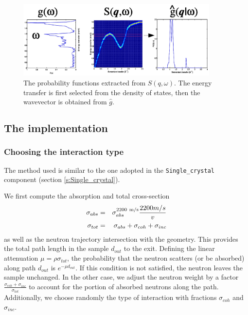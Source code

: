 \begin{figure}
  \begin{center}
    \includegraphics[width=0.9\textwidth]{figures/Sqw_sampling.eps}
  \end{center}
\caption{The probability functions extracted from $S(q,\omega)$. The energy transfer is first selected from the density of states, then the wavevector is obtained from $\hat g$.}
\label{f:isotropic-sqw}
\end{figure}


\subsection{The implementation}

\subsubsection{Choosing the interaction type}

The method used is similar to the one adopted in the \verb+Single_crystal+ component (section \ref{s:Single_crystal}).

We first compute the absorption and total cross-section
\begin{eqnarray}
\sigma_{abs} &=& \sigma_{abs}^{{\rm 2200~m/s}}\frac{2200 m/s}{v} \\
\sigma_{tot} &=& \sigma_{abs} + \sigma_{coh} + \sigma_{inc}
\end{eqnarray}
as well as the neutron trajectory intersection with the geometry. This provides the total path length in the sample $d_{out}$ to the exit.
Defining the linear attenuation $\mu = \rho\sigma_{tot}$, the probability that the neutron scatters (or be absorbed) along path $d_{out}$ is $e^{-\mu d_{out}}$. If this condition is not satisfied, the neutron leaves the sample unchanged.
In the other case, we adjust the neutron weight by a factor $\frac{\sigma_{coh} + \sigma_{inc}}{\sigma_{tot}}$ to account for the portion of absorbed neutrons along the path.
Additionally, we choose randomly the type of interaction with fractions $\sigma_{coh}$ and $\sigma_{inc}$.

